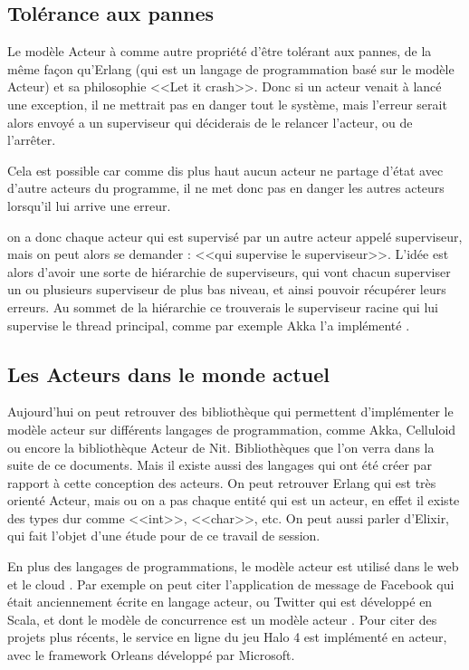 \documentclass[11pt, a4paper]{article}
\begin{document}
\subsection{Tolérance aux pannes}
Le modèle Acteur à comme autre propriété d'être tolérant aux pannes, de la même façon qu'Erlang (qui est un langage de programmation basé sur le modèle Acteur) et sa philosophie <<Let it crash>>. Donc si un acteur venait à lancé une exception, il ne mettrait pas en danger tout le système, mais l'erreur serait alors envoyé a un superviseur qui déciderais de le relancer l'acteur, ou de l’arrêter.
\par Cela est possible car comme dis plus haut aucun acteur ne partage d'état avec d'autre acteurs du programme, il ne met donc pas en danger les autres acteurs lorsqu'il lui arrive une erreur.
\par on a donc chaque acteur qui est supervisé par un autre acteur appelé superviseur, mais on peut alors se demander : <<qui supervise le superviseur>>. L'idée est alors d'avoir une sorte de hiérarchie de superviseurs, qui vont chacun superviser un ou plusieurs superviseur de plus bas niveau, et ainsi pouvoir récupérer leurs erreurs. Au sommet de la hiérarchie ce trouverais le superviseur racine qui lui supervise le thread principal, comme par exemple Akka l'a implémenté \cite{akka}.

\subsection{Les Acteurs dans le monde actuel}
Aujourd'hui on peut retrouver des bibliothèque qui permettent d'implémenter le modèle acteur sur différents langages de programmation, comme Akka, Celluloid ou encore la bibliothèque Acteur de Nit. Bibliothèques que l'on verra dans la suite de ce documents. Mais il existe aussi des langages qui ont été créer par rapport à cette conception des acteurs. On peut retrouver Erlang qui est très orienté Acteur, mais ou on a pas chaque entité qui est un acteur, en effet il existe des types dur comme <<int>>, <<char>>, etc. On peut aussi parler d’Elixir, qui fait l'objet d'une étude pour de ce travail de session.
\par En plus des langages de programmations, le modèle acteur est utilisé dans le web et le cloud \cite{agha2014actors,vecchiola2009high}. Par exemple on peut citer l'application de message de Facebook qui était anciennement écrite en langage acteur, ou Twitter qui est développé en Scala, et dont le modèle de concurrence est un modèle acteur \cite{twitter_concurency}. Pour citer des projets plus récents, le service en ligne du jeu Halo 4 est implémenté en acteur, avec le framework Orleans développé par Microsoft.
\end{document}
